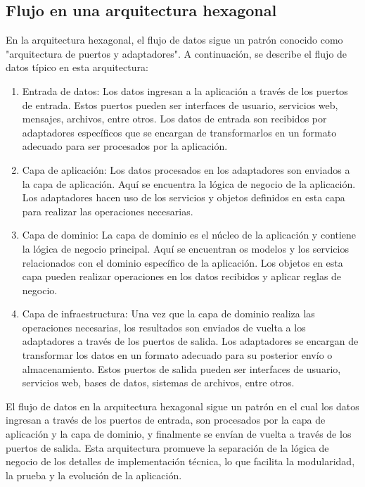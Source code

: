 \documentclass[executivepaper]{article}
\begin{document}
\subsection{Flujo en una arquitectura hexagonal}

En la arquitectura hexagonal, el flujo de datos sigue un patrón conocido como "arquitectura de puertos y adaptadores". A continuación, se describe el flujo de datos típico en esta arquitectura:

\begin{enumerate}
    \item Entrada de datos: Los datos ingresan a la aplicación a través de los puertos de entrada. Estos puertos pueden ser interfaces de usuario, servicios web, mensajes, archivos, entre otros. Los datos de entrada son recibidos por adaptadores específicos que se encargan de transformarlos en un formato adecuado para ser procesados por la aplicación.
    \item Capa de aplicación: Los datos procesados en los adaptadores son enviados a la capa de aplicación. Aquí se encuentra la lógica de negocio de la aplicación. Los adaptadores hacen uso de los servicios y objetos definidos en esta capa para realizar las operaciones necesarias.
    \item Capa de dominio: La capa de dominio es el núcleo de la aplicación y contiene la lógica de negocio principal. Aquí se encuentran os modelos y los servicios relacionados con el dominio específico de la aplicación. Los objetos en esta capa pueden realizar operaciones en los datos recibidos y aplicar reglas de negocio.
    \item Capa de infraestructura: Una vez que la capa de dominio realiza las operaciones necesarias, los resultados son enviados de vuelta a los adaptadores a través de los puertos de salida. Los adaptadores se encargan de transformar los datos en un formato adecuado para su posterior envío o almacenamiento. Estos puertos de salida pueden ser interfaces de usuario, servicios web, bases de datos, sistemas de archivos, entre otros.
\end{enumerate}

El flujo de datos en la arquitectura hexagonal sigue un patrón en el cual los datos ingresan a través de los puertos de entrada, son procesados por la capa de aplicación y la capa de dominio, y finalmente se envían de vuelta a través de los puertos de salida. Esta arquitectura promueve la separación de la lógica de negocio de los detalles de implementación técnica, lo que facilita la modularidad, la prueba y la evolución de la aplicación.
\end{document}
